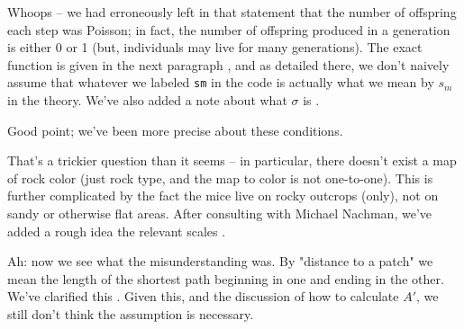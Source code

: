 \reply
Whoops -- we had erroneously left in that statement that the number of offspring each step was Poisson;
in fact, the number of offspring produced in a generation is either 0 or 1
(but, individuals may live for many generations).
The exact function is given in the next paragraph \revref,
and as detailed there, we don't naively assume
that whatever we labeled \texttt{sm} in the code
is actually what we mean by $s_m$ in the theory.
We've also added a note about what $\sigma$ is .


\reply
Good point; we've been more precise about these conditions. \revref



\reply
That's a trickier question than it seems --
in particular, there doesn't exist a map of rock color
(just rock type, and the map to color is not one-to-one).
This is further complicated by the fact the mice live on rocky outcrops (only),
not on sandy or otherwise flat areas.
After consulting with Michael Nachman,
we've added a rough idea the relevant scales \revref.



\reply
Ah: now we see what the misunderstanding was.
By "distance to a patch" we mean the length of the shortest path beginning in one and ending in the other.
We've clarified this \revref.
Given this, and the discussion of how to calculate $A'$,
we still don't think the assumption is necessary.



